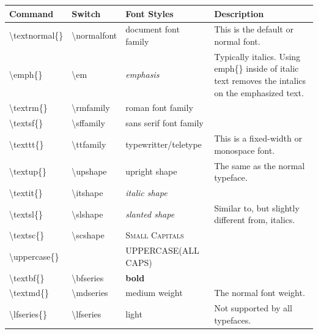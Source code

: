 \documentclass[12pt]{article}
\begin{document}
\begin{table}[h!]
\centering
\begin{tabular}{ @{} p{} @{} p{} @{} p{} @{} L{.37\textwidth} @{} }
Command & Switch & Font Styles & Description \\ \toprule
\ttfamily \textbackslash textnormal\{\} & \ttfamily\textbackslash normalfont & document font family & This is the default or normal font. \\ \midrule
\ttfamily \textbackslash emph\{\}       & \ttfamily\textbackslash em         &
\em emphasis & Typically italics.  Using emph\{\} inside of italic text removes the intalics on the emphasized text. \\ \midrule
\ttfamily \textbackslash textrm\{\}     & \ttfamily\textbackslash rmfamily   &
\rmfamily roman font family &  \\ \midrule
\ttfamily \textbackslash textsf\{\}     & \ttfamily\textbackslash sffamily   &
\sffamily sans serif font family &  \\ \midrule
\ttfamily \textbackslash texttt\{\}     & \ttfamily\textbackslash ttfamily   &
\ttfamily typewritter/teletype & This is a fixed-width or monospace font. \\ \midrule
\ttfamily \textbackslash textup\{\}     & \ttfamily\textbackslash upshape    &
\upshape upright shape & The same as the normal typeface. \\ \midrule
\ttfamily \textbackslash textit\{\}     & \ttfamily\textbackslash itshape    &
\itshape italic shape &  \\ \midrule
\ttfamily \textbackslash textsl\{\}     & \ttfamily\textbackslash slshape    &
\slshape slanted shape & Similar to, but slightly different from, italics. \\ \midrule
\ttfamily \textbackslash textsc\{\}     & \ttfamily\textbackslash scshape    &
\scshape Small Capitals &  \\ \midrule
\ttfamily \textbackslash uppercase\{\}  &                                    &
\uppercase{Uppercase(all caps)} &  \\ \midrule
\ttfamily \textbackslash textbf\{\}     & \ttfamily\textbackslash bfseries   &
\bfseries bold &  \\ \midrule
\ttfamily \textbackslash textmd\{\}     & \ttfamily\textbackslash mdseries   &
\mdseries medium weight & The normal font weight. \\ \midrule
\ttfamily \textbackslash lfseries\{\}   & \ttfamily\textbackslash lfseries   &
light & Not supported by all typefaces.  \\ \bottomrule
\end{tabular}
\end{table}
\end{document}
